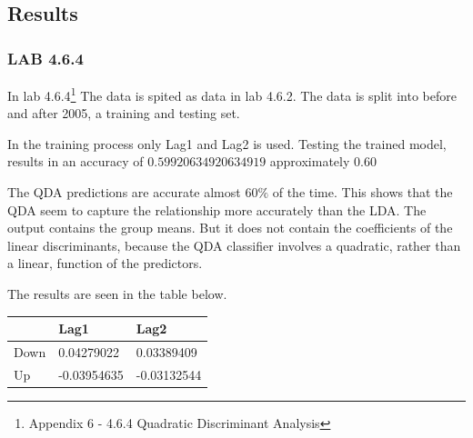 \subsection{Results}
\subsubsection*{LAB 4.6.4}
In lab 4.6.4\footnote{Appendix 6 - 4.6.4 Quadratic Discriminant Analysis} The data is spited as data in lab 4.6.2. The data is split into before and after 2005, a training and testing set.

In the training process only Lag1 and Lag2 is used. Testing the trained model, results in an accuracy of $0.59920634920634919$ approximately $0.60$

The QDA predictions are accurate almost $60\%$ of the time. This shows that the QDA seem to capture the relationship more accurately than the LDA. The output contains the group means. But it does not contain the coefficients of the linear discriminants, because the QDA classifier involves a quadratic, rather than a linear, function of the predictors.

The results are seen in the table below.

\begin{longtable}[]{@{}lll@{}}
	\toprule
	& Lag1 & Lag2\tabularnewline
	\midrule
	\endhead
	Down & 0.04279022 & 0.03389409\tabularnewline
	Up & -0.03954635 & -0.03132544\tabularnewline
	\bottomrule
\end{longtable}